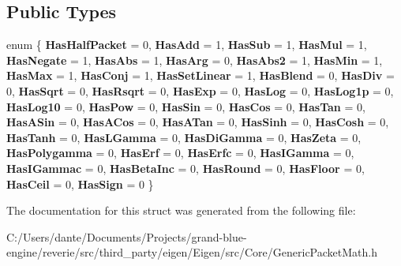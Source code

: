 \subsection*{Public Types}
\begin{DoxyCompactItemize}
\item 
\mbox{\label{struct_eigen_1_1internal_1_1default__packet__traits_aa031f7ddfade2b66a30ddc235d817d79}} 
enum \{ \newline
{\bfseries Has\+Half\+Packet} = 0, 
{\bfseries Has\+Add} = 1, 
{\bfseries Has\+Sub} = 1, 
{\bfseries Has\+Mul} = 1, 
\newline
{\bfseries Has\+Negate} = 1, 
{\bfseries Has\+Abs} = 1, 
{\bfseries Has\+Arg} = 0, 
{\bfseries Has\+Abs2} = 1, 
\newline
{\bfseries Has\+Min} = 1, 
{\bfseries Has\+Max} = 1, 
{\bfseries Has\+Conj} = 1, 
{\bfseries Has\+Set\+Linear} = 1, 
\newline
{\bfseries Has\+Blend} = 0, 
{\bfseries Has\+Div} = 0, 
{\bfseries Has\+Sqrt} = 0, 
{\bfseries Has\+Rsqrt} = 0, 
\newline
{\bfseries Has\+Exp} = 0, 
{\bfseries Has\+Log} = 0, 
{\bfseries Has\+Log1p} = 0, 
{\bfseries Has\+Log10} = 0, 
\newline
{\bfseries Has\+Pow} = 0, 
{\bfseries Has\+Sin} = 0, 
{\bfseries Has\+Cos} = 0, 
{\bfseries Has\+Tan} = 0, 
\newline
{\bfseries Has\+A\+Sin} = 0, 
{\bfseries Has\+A\+Cos} = 0, 
{\bfseries Has\+A\+Tan} = 0, 
{\bfseries Has\+Sinh} = 0, 
\newline
{\bfseries Has\+Cosh} = 0, 
{\bfseries Has\+Tanh} = 0, 
{\bfseries Has\+L\+Gamma} = 0, 
{\bfseries Has\+Di\+Gamma} = 0, 
\newline
{\bfseries Has\+Zeta} = 0, 
{\bfseries Has\+Polygamma} = 0, 
{\bfseries Has\+Erf} = 0, 
{\bfseries Has\+Erfc} = 0, 
\newline
{\bfseries Has\+I\+Gamma} = 0, 
{\bfseries Has\+I\+Gammac} = 0, 
{\bfseries Has\+Beta\+Inc} = 0, 
{\bfseries Has\+Round} = 0, 
\newline
{\bfseries Has\+Floor} = 0, 
{\bfseries Has\+Ceil} = 0, 
{\bfseries Has\+Sign} = 0
 \}
\end{DoxyCompactItemize}


The documentation for this struct was generated from the following file\+:\begin{DoxyCompactItemize}
\item 
C\+:/\+Users/dante/\+Documents/\+Projects/grand-\/blue-\/engine/reverie/src/third\+\_\+party/eigen/\+Eigen/src/\+Core/Generic\+Packet\+Math.\+h\end{DoxyCompactItemize}
